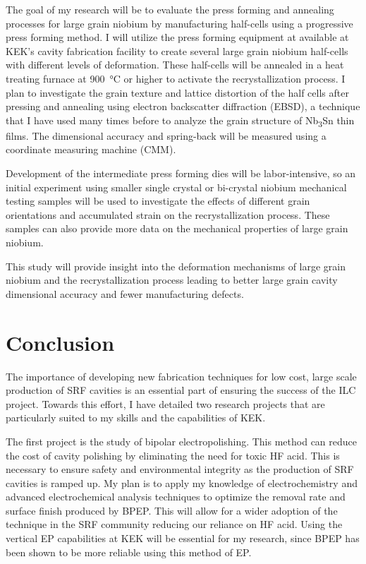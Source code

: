 \documentclass[]{revtex4-2}
\begin{document}
    The goal of my research will be to evaluate the press forming and annealing processes for large grain niobium by manufacturing half-cells using a progressive press forming method. I will utilize the press forming equipment at available at KEK's cavity fabrication facility to create several large grain niobium half-cells with different levels of deformation. These half-cells will be annealed in a heat treating furnace at \qty{900}{\degreeCelsius} or higher to activate the recrystallization process. I plan to investigate the grain texture and lattice distortion of the half cells after pressing and annealing using electron backscatter diffraction (EBSD), a technique that I have used many times before to analyze the grain structure of Nb\textsubscript{3}Sn thin films. The dimensional accuracy and spring-back will be measured using a coordinate measuring machine (CMM). 
    
    Development of the intermediate press forming dies will be labor-intensive, so an initial experiment using smaller single crystal or bi-crystal niobium mechanical testing samples will be used to investigate the effects of different grain orientations and accumulated strain on the recrystallization process. These samples can also provide more data on the mechanical properties of large grain niobium.
    
    This study will provide insight into the deformation mechanisms of large grain niobium and the recrystallization process leading to better large grain cavity dimensional accuracy and fewer manufacturing defects.



\section{Conclusion}

    The importance of developing new fabrication techniques for low cost, large scale production of SRF cavities is an essential part of ensuring the success of the ILC project. Towards this effort, I have detailed two research projects that are particularly suited to my skills and the capabilities of KEK. 
    
    The first project is the study of bipolar electropolishing. This method can reduce the cost of cavity polishing by eliminating the need for toxic HF acid. This is necessary to ensure safety and environmental integrity as the production of SRF cavities is ramped up. My plan is to apply my knowledge of electrochemistry and advanced electrochemical analysis techniques to optimize the removal rate and surface finish produced by BPEP. This will allow for a wider adoption of the technique in the SRF community reducing our reliance on HF acid. Using the vertical EP capabilities at KEK will be essential for my research, since BPEP has been shown to be more reliable using this method of EP.
\end{document}
